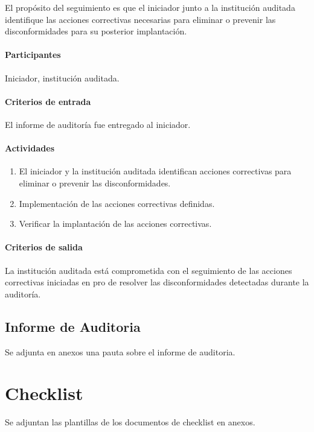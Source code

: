 El propósito del seguimiento es que el iniciador junto a la institución auditada identifique las acciones correctivas necesarias para eliminar o prevenir las disconformidades para su posterior implantación.

\paragraph{Participantes\\}

Iniciador, institución auditada.

\paragraph{Criterios de entrada\\}

El informe de auditoría fue entregado al iniciador.

\paragraph{Actividades}

\begin{enumerate}
	\item
		El iniciador y la institución auditada identifican acciones correctivas para eliminar o prevenir las disconformidades.
	\item
		Implementación de las acciones correctivas definidas.
	\item
		Verificar la implantación de las acciones correctivas.
\end{enumerate}

\paragraph{Criterios de salida\\}

La institución auditada está comprometida con el seguimiento de las acciones correctivas iniciadas en pro de resolver las disconformidades detectadas durante la auditoría.

\subsection{Informe de Auditoria}

Se adjunta en anexos una pauta sobre el informe de auditoria.

\section{Checklist}

Se adjuntan las plantillas de los documentos de checklist en anexos. 




















